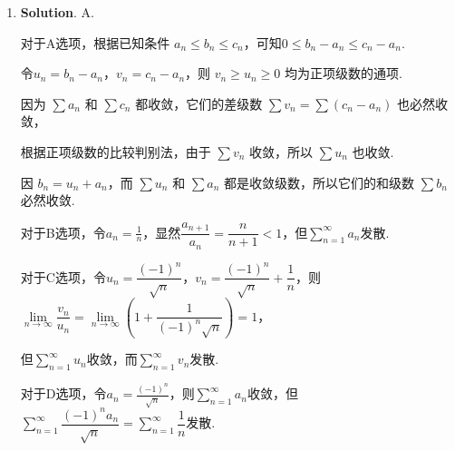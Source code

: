 \documentclass[../Main.tex]{subfiles}
\begin{document}
\begin{enumerate}
        用球坐标代换，$\mathrm{d}S=R^2\sin\varphi\,\mathrm{d}\varphi\,\mathrm{d}\theta$，因此
        \[
          \begin{aligned}
            c \iint\limits_{S} z\,\mathrm{d}S= & c \int_0^{2\pi}\mathrm{d}\theta\int_0^{\frac{\pi}{2}} R\cos\varphi R^2\sin\varphi\,\mathrm{d}\varphi \\
            =                                  & c\pi R^3\int_0^{\frac{\pi}{2}} \sin 2\varphi\,\mathrm{d}\varphi                                      \\
            =                                  & c\pi R^3\left[-\frac{\cos 2\varphi}{2}\right]_0^{\frac{\pi}{2}}                                      \\
            =                                  & c\pi R^3.
          \end{aligned}
        \]

  \item \textbf{Solution}. A.

        对于A选项，根据已知条件 $a_n \leq b_n \leq c_n$，可知$0 \leq b_n - a_n \leq c_n - a_n$.

        令$u_n = b_n - a_n$，$v_n = c_n - a_n$，则 $v_n \geq u_n \geq 0$ 均为正项级数的通项.

        因为 $\sum a_n$ 和 $\sum c_n$ 都收敛，它们的差级数 $\sum v_n = \sum (c_n - a_n)$ 也必然收敛，

        根据正项级数的比较判别法，由于 $\sum v_n$ 收敛，所以 $\sum u_n$ 也收敛.

        因 $b_n = u_n + a_n$，而 $\sum u_n$ 和 $\sum a_n$ 都是收敛级数，所以它们的和级数 $\sum b_n$ 必然收敛.

        对于B选项，令$a_n=\frac{1}{n}$，显然$\dfrac{a_{n+1}}{a_n}=\dfrac{n}{n+1}<1$，但$\sum\limits_{n=1}^{\infty} a_n$发散.

        对于C选项，令$u_n = \dfrac{(-1)^n}{\sqrt{n}}$，$v_n = \dfrac{(-1)^n}{\sqrt{n}} + \dfrac{1}{n}$，则$\lim \limits_{n \to \infty} \dfrac{v_n}{u_n} = \lim \limits_{n \to \infty} \left( 1 + \dfrac{1}{(-1)^n \sqrt{n}} \right) = 1$，

        但$\sum\limits_{n=1}^{\infty} u_n$收敛，而$\sum\limits_{n=1}^{\infty} v_n$发散.

        对于D选项，令$a_n = \frac{(-1)^n}{\sqrt{n}}$，则$\sum\limits_{n=1}^{\infty} a_n$收敛，但$\sum\limits_{n=1}^{\infty} \dfrac{(-1)^n a_n}{\sqrt{n}} = \sum\limits_{n=1}^{\infty} \dfrac{1}{n}$发散.

\end{enumerate}
\end{document}
